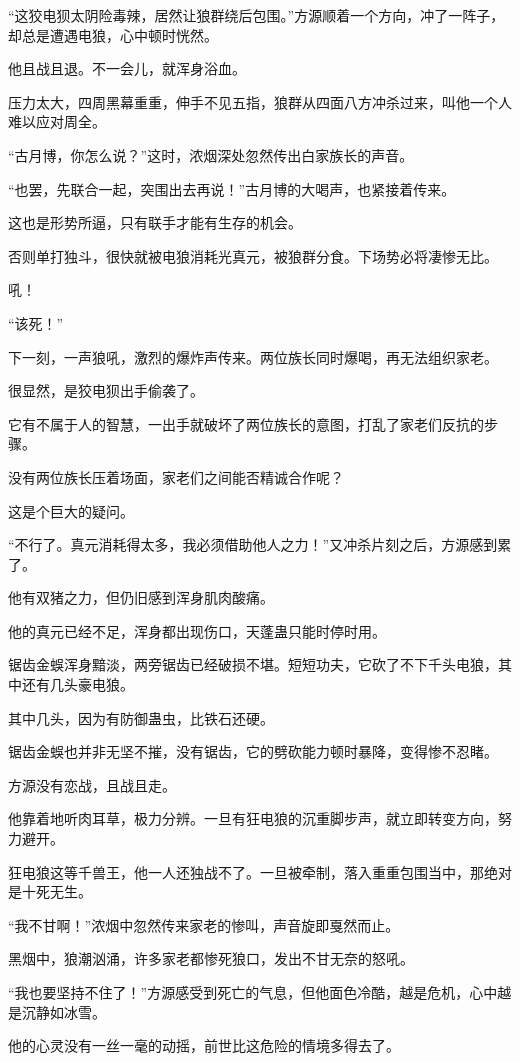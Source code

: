 \begin{this_body}
“这狡电狈太阴险毒辣，居然让狼群绕后包围。”方源顺着一个方向，冲了一阵子，却总是遭遇电狼，心中顿时恍然。

他且战且退。不一会儿，就浑身浴血。

压力太大，四周黑幕重重，伸手不见五指，狼群从四面八方冲杀过来，叫他一个人难以应对周全。

“古月博，你怎么说？”这时，浓烟深处忽然传出白家族长的声音。

“也罢，先联合一起，突围出去再说！”古月博的大喝声，也紧接着传来。

这也是形势所逼，只有联手才能有生存的机会。

否则单打独斗，很快就被电狼消耗光真元，被狼群分食。下场势必将凄惨无比。

吼！

“该死！”

下一刻，一声狼吼，激烈的爆炸声传来。两位族长同时爆喝，再无法组织家老。

很显然，是狡电狈出手偷袭了。

它有不属于人的智慧，一出手就破坏了两位族长的意图，打乱了家老们反抗的步骤。

没有两位族长压着场面，家老们之间能否精诚合作呢？

这是个巨大的疑问。

“不行了。真元消耗得太多，我必须借助他人之力！”又冲杀片刻之后，方源感到累了。

他有双猪之力，但仍旧感到浑身肌肉酸痛。

他的真元已经不足，浑身都出现伤口，天蓬蛊只能时停时用。

锯齿金蜈浑身黯淡，两旁锯齿已经破损不堪。短短功夫，它砍了不下千头电狼，其中还有几头豪电狼。

其中几头，因为有防御蛊虫，比铁石还硬。

锯齿金蜈也并非无坚不摧，没有锯齿，它的劈砍能力顿时暴降，变得惨不忍睹。

方源没有恋战，且战且走。

他靠着地听肉耳草，极力分辨。一旦有狂电狼的沉重脚步声，就立即转变方向，努力避开。

狂电狼这等千兽王，他一人还独战不了。一旦被牵制，落入重重包围当中，那绝对是十死无生。

“我不甘啊！”浓烟中忽然传来家老的惨叫，声音旋即戛然而止。

黑烟中，狼潮汹涌，许多家老都惨死狼口，发出不甘无奈的怒吼。

“我也要坚持不住了！”方源感受到死亡的气息，但他面色冷酷，越是危机，心中越是沉静如冰雪。

他的心灵没有一丝一毫的动摇，前世比这危险的情境多得去了。


\end{this_body}
